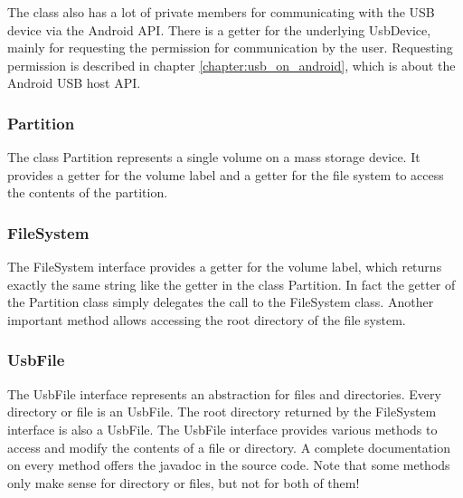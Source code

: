The class also has a lot of private members for communicating with the USB device via the Android API. There is a getter for the underlying UsbDevice, mainly for requesting the permission for communication by the user. Requesting permission is described in chapter \ref{chapter:usb_on_android}, which is about the Android USB host API.

\subsubsection{Partition}

The class Partition represents a single volume on a mass storage device. It provides a getter for the volume label and a getter for the file system to access the contents of the partition.

\subsubsection{FileSystem}

The FileSystem interface provides a getter for the volume label, which returns exactly the same string like the getter in the class Partition. In fact the getter of the Partition class simply delegates the call to the FileSystem class. Another important method allows accessing the root directory of the file system.

\subsubsection{UsbFile}

The UsbFile interface represents an abstraction for files and directories. Every directory or file is an UsbFile. The root directory returned by the FileSystem interface is also a UsbFile. The UsbFile interface provides various methods to access and modify the contents of a file or directory. A complete documentation on every method offers the javadoc in the source code. Note that some methods only make sense for directory or files, but not for both of them!


